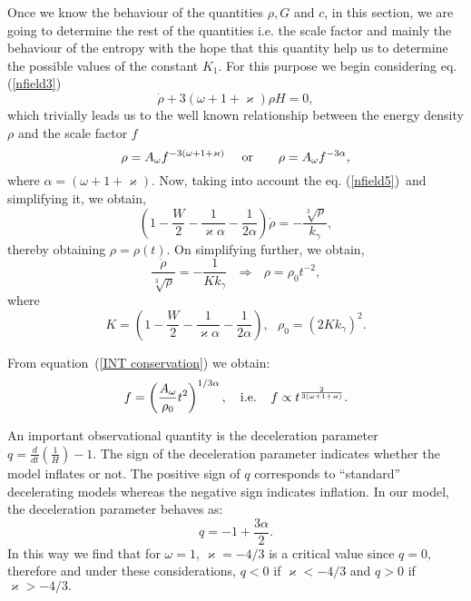 \documentclass{revtex4}
\begin{document}
Once we know the behaviour of the quantities $\rho ,G$ and $c$, in this
section, we are going to determine the rest of the quantities i.e. the scale
factor and mainly the behaviour of the entropy with the hope that this
quantity help us to determine the possible values of the constant $K_{1}.$
For this purpose we begin considering eq. (\ref{nfield3})
\begin{equation}
\dot{\rho}+3\left( \omega +1+\varkappa \right) \rho H=0,
\end{equation}
which trivially leads us to the well known relationship between the energy
density $\rho $ and the scale factor $f$
\begin{equation}
\rho =A_{\omega }f^{-3\left( \omega +1+\varkappa \right) }\text{ \ \ \ or \
\ \ \ \ }\rho =A_{\omega }f^{-3\alpha },  \label{INT conservation}
\end{equation}
where $\alpha =\left( \omega +1+\varkappa \right) .$ Now, taking into
account the eq. (\ref{nfield5})\ and simplifying it, we obtain,
\begin{equation}
\left( 1-\frac{W}{2}-\frac{1}{\varkappa \alpha }-\frac{1}{2\alpha }\right)
\dot{\rho}=-\frac{\sqrt[3]{\rho }}{k_{\gamma }},
\end{equation}
thereby obtaining $\rho =\rho (t).$ On simplifying further, we obtain,
\begin{equation}
\frac{\dot{\rho}}{\sqrt[3]{\rho }}=-\frac{1}{Kk_{\gamma }}\text{ \ \ \ }%
\Longrightarrow \text{ \ \ \ }\rho =\rho _{0}t^{-2},  \label{INT density}
\end{equation}
where
\begin{equation}
K=\left( 1-\frac{W}{2}-\frac{1}{\varkappa \alpha }-\frac{1}{2\alpha }\right)
,\text{ \ \ \ \ }\rho _{0}=\left( 2Kk_{\gamma }\right) ^{2}\text{.}
\end{equation}

From equation\ (\ref{INT conservation}) we obtain:
\begin{equation}
f=\left( \frac{A_{\omega }}{\rho _{0}}t^{2}\right) ^{1/3\alpha },\text{ \ \
i.e. \ \ }f\propto t^{\frac{2}{3\left( \omega +1+\varkappa \right) }}.
\label{INT sfactor}
\end{equation}

An important observational quantity is the deceleration parameter $q=\frac{d%
}{dt}\left( \frac{1}{H}\right) -1$. The sign of the deceleration parameter
indicates whether the model inflates or not. The positive sign of $q$
corresponds to ``standard'' decelerating models whereas the negative sign
indicates inflation. In our model, the deceleration parameter behaves as:
\begin{equation}
q=-1+\frac{3\alpha }{2}.
\end{equation}
In this way we find that for $\omega =1$, $\varkappa =-4/3$ is a critical
value since $q=0,$ therefore and under these considerations, $q<0$ if $%
\varkappa <-4/3$ and $q>0$ if $\varkappa >-4/3.$
\end{document}
